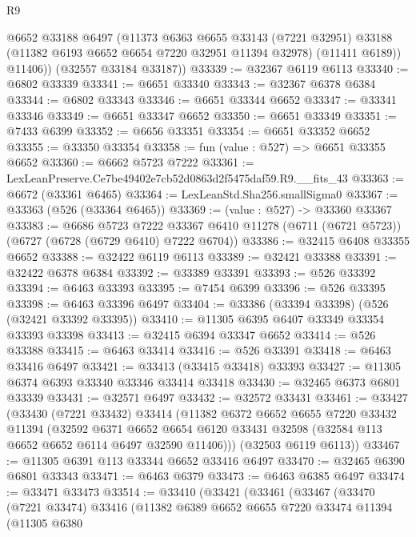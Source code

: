 \begin{lexlean}{R9}
\begin{coremodule}
          @6652
          @33188
          @6497
          (@11373
            @6363
            @6655
            @33143
            (@7221 @32951)
            @33188
            (@11382 @6193 @6652 @6654 @7220 @32951 @11394 @32978)
            (@11411 @6189))
          @11406))
      (@32557 @33184 @33187))
@33339 := @32367 @6119 @6113
@33340 := @6802 @33339
@33341 := @6651 @33340
@33343 := @32367 @6378 @6384
@33344 := @6802 @33343
@33346 := @6651 @33344 @6652
@33347 := @33341 @33346
@33349 := @6651 @33347 @6652
@33350 := @6651 @33349
@33351 := @7433 @6399
@33352 := @6656 @33351
@33354 := @6651 @33352 @6652
@33355 := @33350 @33354
@33358 := fun (value : @527) => @6651 @33355 @6652
@33360 := @6662 @5723 @7222
@33361 := LexLeanPreserve.Ce7be49402e7cb52d0863d2f5475daf59.R9.__fits_43
@33363 := @6672 (@33361 @6465)
@33364 := LexLeanStd.Sha256.smallSigma0
@33367 := @33363 (@526 (@33364 @6465))
@33369 := (value : @527) -> @33360 @33367
@33383 := @6686
    @5723
    @7222
    @33367
    @6410
    @11278
    (@6711 (@6721 @5723))
    (@6727 (@6728 (@6729 @6410) @7222 @6704))
@33386 := @32415 @6408 @33355 @6652
@33388 := @32422 @6119 @6113
@33389 := @32421 @33388
@33391 := @32422 @6378 @6384
@33392 := @33389 @33391
@33393 := @526 @33392
@33394 := @6463 @33393
@33395 := @7454 @6399
@33396 := @526 @33395
@33398 := @6463 @33396 @6497
@33404 := @33386 (@33394 @33398) (@526 (@32421 @33392 @33395))
@33410 := @11305 @6395 @6407 @33349 @33354 @33393 @33398
@33413 := @32415 @6394 @33347 @6652
@33414 := @526 @33388
@33415 := @6463 @33414
@33416 := @526 @33391
@33418 := @6463 @33416 @6497
@33421 := @33413 (@33415 @33418) @33393
@33427 := @11305 @6374 @6393 @33340 @33346 @33414 @33418
@33430 := @32465 @6373 @6801 @33339
@33431 := @32571 @6497
@33432 := @32572 @33431
@33461 := @33427
    (@33430
      (@7221 @33432)
      @33414
      (@11382
        @6372
        @6652
        @6655
        @7220
        @33432
        @11394
        (@32592
          @6371
          @6652
          @6654
          @6120
          @33431
          @32598
          (@32584 @113 @6652 @6652 @6114 @6497 @32590 @11406)))
      (@32503 @6119 @6113))
@33467 := @11305 @6391 @113 @33344 @6652 @33416 @6497
@33470 := @32465 @6390 @6801 @33343
@33471 := @6463 @6379
@33473 := @6463 @6385 @6497
@33474 := @33471 @33473
@33514 := @33410
    (@33421
      (@33461
        (@33467
          (@33470
            (@7221 @33474)
            @33416
            (@11382
              @6389
              @6652
              @6655
              @7220
              @33474
              @11394
              (@11305
                @6380

\end{coremodule}
\end{lexlean}
